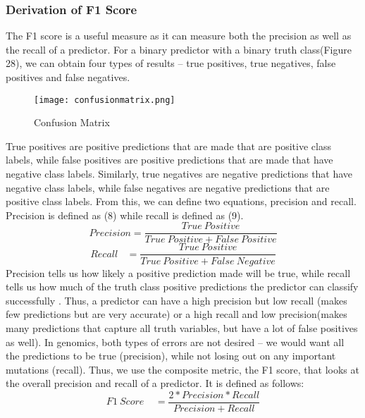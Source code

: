 \documentclass{article}
\begin{document}
\subsubsection{Derivation of F1 Score}
The F1 score is a useful measure as it can measure both the precision as well as the recall of a predictor. For a binary predictor with a binary truth class(Figure 28), we can obtain four types of results -- true positives, true negatives, false positives and false negatives. 
\begin{figure}[H]
\texttt{[image: confusionmatrix.png]}
\caption{Confusion Matrix}
\centering
\end{figure}
True positives are positive predictions that are made that are positive class labels, while false positives are positive predictions that are made that have negative class labels. Similarly, true negatives are negative predictions that have negative class labels, while false negatives are negative predictions that are positive class labels. From this, we can define two equations, precision and recall. Precision is defined as (8) while recall is defined as (9). 
\begin{equation}
Precision = \frac{True \ Positive}{True\  Positive + False \ Positive} 
\end{equation}
\begin{equation}
Recall\ \ \ \ = \frac{True\ Positive}{True \ Positive + False \ Negative} 
\end{equation}
Precision tells us how likely a positive prediction made will be true, while recall tells us how much of the truth class positive predictions the predictor can classify successfully . Thus, a predictor can have a high precision but low recall (makes few predictions but are very accurate) or a high recall and low precision(makes many predictions that capture all truth variables, but have a lot of false positives as well). In genomics, both types of errors are not desired -- we would want all the predictions to be true (precision), while not losing out on any important mutations (recall). Thus, we use the composite metric, the F1 score, that looks at the overall precision and recall of a predictor. It is defined as follows:
\begin{equation}
{F1} \ Score \ \ \  \ \ = \frac{2*Precision*Recall}{Precision + Recall} 
\end{equation}
\\
\end{document}
